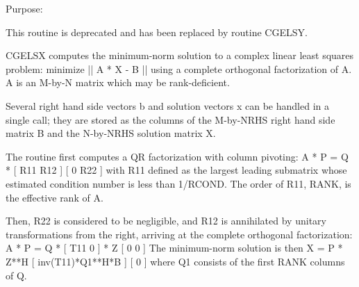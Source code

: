  \begin{DoxyParagraph}{Purpose\+: }
\begin{DoxyVerb} This routine is deprecated and has been replaced by routine CGELSY.

 CGELSX computes the minimum-norm solution to a complex linear least
 squares problem:
     minimize || A * X - B ||
 using a complete orthogonal factorization of A.  A is an M-by-N
 matrix which may be rank-deficient.

 Several right hand side vectors b and solution vectors x can be
 handled in a single call; they are stored as the columns of the
 M-by-NRHS right hand side matrix B and the N-by-NRHS solution
 matrix X.

 The routine first computes a QR factorization with column pivoting:
     A * P = Q * [ R11 R12 ]
                 [  0  R22 ]
 with R11 defined as the largest leading submatrix whose estimated
 condition number is less than 1/RCOND.  The order of R11, RANK,
 is the effective rank of A.

 Then, R22 is considered to be negligible, and R12 is annihilated
 by unitary transformations from the right, arriving at the
 complete orthogonal factorization:
    A * P = Q * [ T11 0 ] * Z
                [  0  0 ]
 The minimum-norm solution is then
    X = P * Z**H [ inv(T11)*Q1**H*B ]
                 [        0         ]
 where Q1 consists of the first RANK columns of Q.\end{DoxyVerb}
 
\end{DoxyParagraph}

